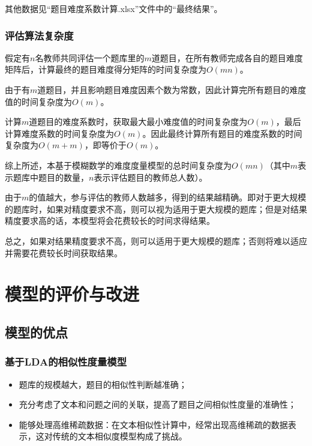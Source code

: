 其他数据见“题目难度系数计算.xlsx”文件中的“最终结果”。

\subsubsection{评估算法复杂度}

假定有$n$名教师共同评估一个题库里的$m$道题目，在所有教师完成各自的题目难度矩阵后，计算最终的题目难度得分矩阵的时间复杂度为$O(mn)$。

由于有$m$道题目，并且影响题目难度因素个数为常数，因此计算完所有题目的难度值的时间复杂度为$O(m)$。

计算$m$道题目的难度系数时，获取最大最小难度值的时间复杂度为$O(m)$，最后计算难度系数的时间复杂度为$O(m)$。因此最终计算所有题目的难度系数的时间复杂度为$O(m + m)$，即等价于$O(m)$。

综上所述，本基于模糊数学的难度度量模型的总时间复杂度为$O(mn)$（其中$m$表示题库中题目的数量，$n$表示评估题目的教师总人数）。

由于$m$的值越大，参与评估的教师人数越多，得到的结果越精确。即对于更大规模的题库时，如果对精度要求不高，则可以视为适用于更大规模的题库；但是对结果精度要求高的话，本模型将会花费较长的时间求得结果。

总之，如果对结果精度要求不高，则可以适用于更大规模的题库；否则将难以适应并需要花费较长时间获取结果。

%
%

\section{模型的评价与改进}

\subsection{模型的优点}

\subsubsection{基于LDA的相似性度量模型}

\begin{itemize}
    \item 题库的规模越大，题目的相似性判断越准确；
    \item 充分考虑了文本和问题之间的关联，提高了题目之间相似性度量的准确性；
    \item 能够处理高维稀疏数据：在文本相似性计算中，经常出现高维稀疏的数据表示，这对传统的文本相似度模型构成了挑战。
\end{itemize}


